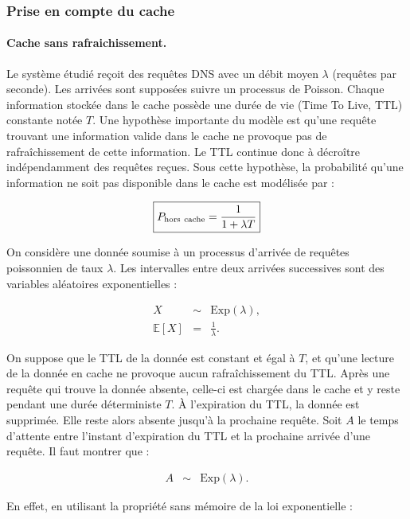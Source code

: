 \documentclass[12pt, a4paper]{report}
\begin{document}
	\subsubsection{Prise en compte du cache}

	\paragraph{Cache sans rafraichissement.} Le système étudié reçoit des requêtes DNS avec un débit moyen
	$\lambda$ (requêtes par seconde). Les arrivées sont supposées suivre
	un processus de Poisson.
	Chaque information stockée dans le cache possède une durée de vie
	(Time To Live, TTL) constante notée $T$.
	Une hypothèse importante du modèle est qu'une requête trouvant une
	information valide dans le cache ne provoque pas de rafraîchissement
	de cette information. Le TTL continue donc à décroître indépendamment
	des requêtes reçues.
	Sous cette hypothèse, la probabilité qu'une information ne soit pas
	disponible dans le cache est modélisée par :


	\[
	\boxed{
	P_{\rm hors~cache}=
	\frac{1}{1+\lambda T}
	}
	\]




	\noindent On considère une donnée soumise à un processus d'arrivée de requêtes
	poissonnien de taux $\lambda$. Les intervalles entre deux arrivées
	successives sont des variables aléatoires exponentielles :

	\begin{eqnarray}
	X &\sim& \mathrm{Exp}(\lambda),\\
	\mathbb{E}[X] &=& \frac{1}{\lambda}.
	\end{eqnarray}

	\noindent On suppose que le TTL de la donnée est constant et égal à $T$, et
	qu'une lecture de la donnée en cache ne provoque aucun rafraîchissement
	du TTL.  Après une requête qui trouve la donnée absente, celle-ci est chargée dans
	le cache et y reste pendant une durée déterministe $T$. À l'expiration
	du TTL, la donnée est supprimée. Elle reste alors absente jusqu'à la
	prochaine requête.
	Soit $A$ le temps d'attente entre l'instant d'expiration du TTL et la
	prochaine arrivée d'une requête. Il faut montrer que :

	\begin{eqnarray}
	A &\sim& \mathrm{Exp}(\lambda).
	\end{eqnarray}

	\noindent En effet, en utilisant la propriété sans mémoire de la loi exponentielle :
\end{document}
